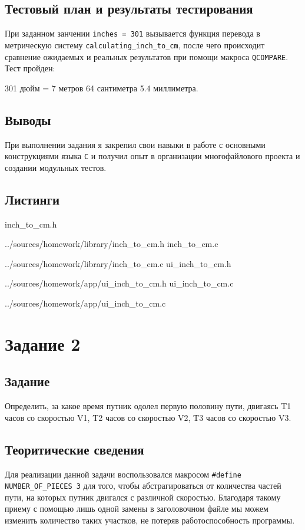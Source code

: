 \documentclass[12pt,a4paper]{report}
\begin{document}
\subsection{Тестовый план и результаты тестирования}
\hspace{\parindent}При заданном занчении \texttt{inches = 301} вызывается функция перевода в метрическую систему \texttt{calculating\_inch\_to\_cm}, после чего происходит сравнение ожидаемых и реальных результатов при помощи макроса \texttt{QCOMPARE}. Тест пройден: 
\begin{center}301 дюйм = 7 метров 64 сантиметра 5.4 миллиметра.\end{center}

\subsection{Выводы}
\hspace{\parindent}При выполнении задания я закрепил свои навыки в работе с основными конструкциями языка \texttt{C} и получил опыт в организации многофайлового проекта и создании модульных тестов.

\newpage
\subsection*{Листинги}
inch\_to\_cm.h

{../sources/homework/library/inch_to_cm.h}
inch\_to\_cm.c

{../sources/homework/library/inch_to_cm.c}
ui\_inch\_to\_cm.h

{../sources/homework/app/ui_inch_to_cm.h}
ui\_inch\_to\_cm.c

{../sources/homework/app/ui_inch_to_cm.c}

\newpage

\section{Задание 2}
\subsection{Задание}
Определить, за какое время путник одолел первую половину пути, двигаясь T1 часов со скоростью V1, T2 часов со скоростью V2, T3 часов со скоростью V3.

\subsection{Теоритические сведения}
\hspace{\parindent}Для реализации данной задачи воспользовался макросом \texttt{\#define NUMBER\_OF\_PIECES 3} для того, чтобы абстрагироваться от количества частей пути, на которых путник двигался с различной скоростью. Благодаря такому приему с помощью лишь одной замены в заголовочном файле мы можем изменить количество таких участков, не потеряв работоспособность программы.
\end{document}
